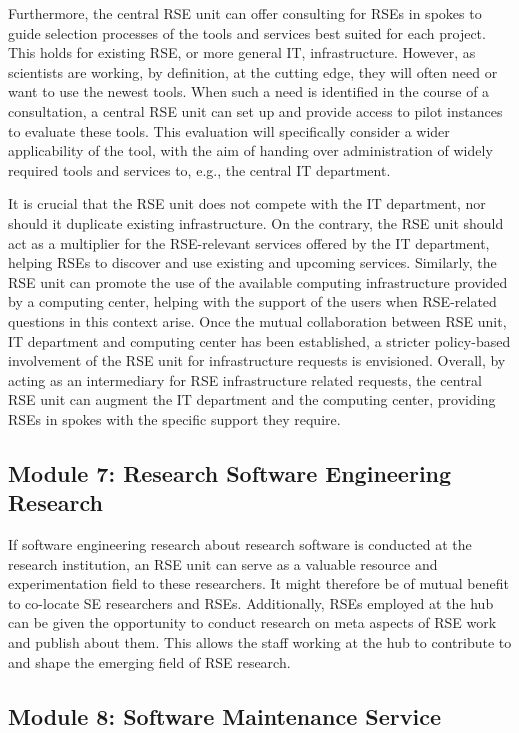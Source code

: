 \documentclass[a4paper]{article}
\begin{document}
Furthermore, the central RSE unit can offer consulting for RSEs in spokes to guide selection processes of the tools and services best suited for each project.
This holds for existing RSE, or more general IT, infrastructure.
However, as scientists are working, by definition, at the cutting edge, they will often need or want to use the newest tools.
When such a need is identified in the course of a consultation, a central RSE unit can set up and provide access to pilot instances to evaluate these tools.
This evaluation will specifically consider a wider applicability of the tool, with the aim of handing over administration of widely required tools and services to, e.g., the central IT department.

It is crucial that the RSE unit does not compete with the IT department, nor should it duplicate existing infrastructure.
On the contrary, the RSE unit should act as a multiplier for the RSE-relevant services offered by the IT department, helping RSEs to discover and use existing and upcoming services.
Similarly, the RSE unit can promote the use of the available computing infrastructure provided by a computing center, helping with the support of the users when RSE-related questions in this context arise.
Once the mutual collaboration between RSE unit, IT department and computing center has been established, a stricter policy-based involvement of the RSE unit for infrastructure requests is envisioned.
Overall, by acting as an intermediary for RSE infrastructure related requests, the central RSE unit can augment the IT department and the computing center, providing RSEs in spokes with the specific support they require.

\subsection{Module 7: Research Software Engineering Research}%
\label{sec:rseresearch}

If software engineering research about research software is conducted at the research institution, an RSE unit can serve as a valuable resource and experimentation field to these researchers.
It might therefore be of mutual benefit to co-locate SE researchers and RSEs.
Additionally, RSEs employed at the hub can be given the opportunity to conduct research on meta aspects of RSE work and publish about them.
This allows the staff working at the hub to contribute to and shape the emerging field of RSE research.

\subsection{Module 8: Software Maintenance Service}%
\label{sec:maintenance}
\end{document}
